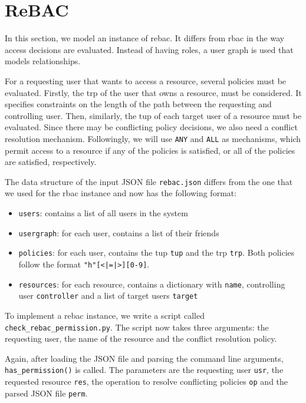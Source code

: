 \documentclass{semdoc}
\begin{document}
\section{ReBAC}
In this section, we model an instance of \gls{rebac}. 
It differs from \gls{rbac} in the way access decisions are evaluated. 
Instead of having roles, a user graph is used that models relationships.

For a requesting user that wants to access a resource, several policies must be evaluated. 
Firstly, the \gls{trp} of the user that owns a resource, must be considered. It specifies constraints on the length of the path between the requesting and controlling user.
Then, similarly, the \gls{tup} of each target user of a resource must be evaluated.
Since there may be conflicting policy decisions, we also need a conflict resolution mechanism.
Followingly, we will use \texttt{ANY} and \texttt{ALL} as mechanisms, which permit access to a resource if any of the policies is satisfied, or all of the policies are satisfied, respectively.

The data structure of the input JSON file \texttt{rebac.json} differs from the one that we used for the \gls{rbac} instance and now has the following format:

\begin{itemize}
  \item \texttt{users}: contains a list of all users in the system
  \item \texttt{usergraph}: for each user, contains a list of their friends
  \item \texttt{policies}: for each user, contains the \gls{tup} \texttt{tup} and the \gls{trp} \texttt{trp}. Both policies follow the format \texttt{"h"[<|=|>][0-9]}.
  \item \texttt{resources}: for each resource, contains a dictionary with \texttt{name}, controlling user \texttt{controller} and a list of target users \texttt{target}
\end{itemize}

To implement a \gls{rebac} instance, we write a script called \texttt{check\_rebac\_permission.py}. 
The script now takes three arguments: the requesting user, the name of the resource and the conflict resolution policy.

Again, after loading the JSON file and parsing the command line arguments, \texttt{has\_permission()} is called. 
The parameters are the requesting user \texttt{usr}, the requested resource \texttt{res}, the operation to resolve conflicting policies \texttt{op} and the parsed JSON file \texttt{perm}.
\end{document}
